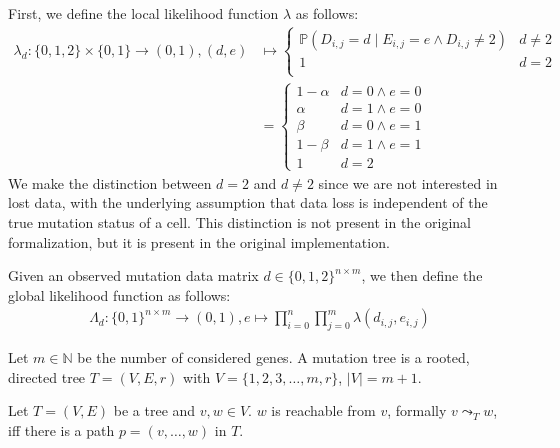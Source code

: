 \begin{definition}
    \label{def:likelihood}
    First, we define the local likelihood function $\lambda$ as follows:
    \begin{align*}
        \lambda_d: \{0, 1, 2\} \times \{0, 1\} \rightarrow (0, 1), (d, e) &\mapsto \begin{cases}
            \mathbb{P}(D_{i,j} = d \mid E_{i,j} = e \wedge D_{i,j} \neq 2) & d \neq 2 \\
            1 & d = 2 \\
        \end{cases} \\
        &= \begin{cases}
            1-\alpha & d = 0 \wedge e = 0 \\
            \alpha & d = 1 \wedge e = 0 \\
            \beta & d = 0 \wedge e = 1 \\
            1-\beta & d = 1 \wedge e = 1 \\
            1 & d = 2
        \end{cases}
    \end{align*}
    We make the distinction between $d = 2$ and $d \neq 2$ since we are not interested in lost data, with the underlying assumption that data loss is independent of the true mutation status of a cell. This distinction is not present in the original formalization, but it is present in the original implementation. 

    Given an observed mutation data matrix $d \in \{0,1,2\}^{n \times m}$, we then define the global likelihood function as follows:
    \begin{align*}
        \Lambda_d : \{0,1\}^{n \times m} \rightarrow (0,1), e \mapsto \prod_{i = 0}^n \prod_{j = 0}^m \lambda(d_{i,j}, e_{i,j})
    \end{align*}
\end{definition}

\begin{definition}
    \label{def:mutation_tree}
    Let $m \in \mathbb{N}$ be the number of considered genes. A mutation tree is a rooted, directed tree $T = (V, E, r)$ with $V = \{1, 2, 3, \dots, m, r\}$, $|V| = m+1$.
\end{definition}

\begin{definition}
    \label{def:reachability}
    Let $T = (V, E)$ be a tree and $v, w \in V$. $w$ is reachable from $v$, formally $v \leadsto_T w$, iff there is a path $p = (v, \dots, w)$ in $T$.
\end{definition}

